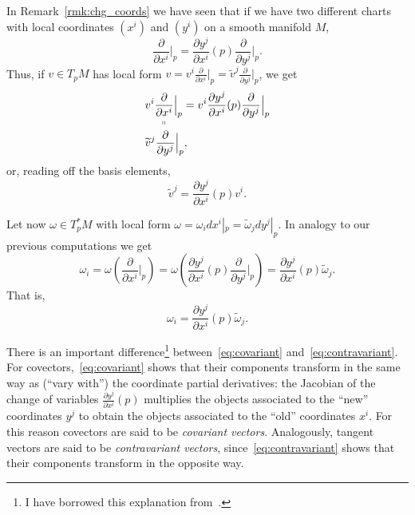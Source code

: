 In Remark~\ref{rmk:chg_coords} we have seen that if we have two different charts with local coordinates $(x^i)$ and $(y^i)$ on a smooth manifold $M$,
\begin{equation}
  \frac{\partial}{\partial x^i}\Big|_p = \frac{\partial y^j}{\partial x^i}(p) \frac{\partial}{\partial y^j}\Big|_p.
\end{equation}
Thus, if $v\in T_pM$ has local form $v = v^i \frac{\partial}{\partial x^i}\big|_p = \widetilde v^j \frac{\partial}{\partial y^j}\big|_p$, we get 
\begin{align}
  & \underset{\shortparallel}{v^i \frac{\partial}{\partial x^i}\Big|_p} = v^i \frac{\partial y^j}{\partial x^i}(p) \frac{\partial}{\partial y^j}\Big|_p \\
  & \widetilde v^j \frac{\partial}{\partial y^j}\Big|_p,
\end{align}
or, reading off the basis elements,
\begin{equation}\label{eq:contravariant}
  \widetilde v^j = \frac{\partial y^j}{\partial x^i}(p) v^i.
\end{equation}

Let now $\omega\in T_p^*M$ with local form $\omega = \omega_i dx^i|_p = \widetilde \omega_j dy^j|_p$.
In analogy to our previous computations we get
\begin{equation}
  \omega_i
  = \omega\left(\frac{\partial}{\partial x^i}\Big|_p\right)
  = \omega\left(\frac{\partial y^j}{\partial x^i}(p) \frac{\partial}{\partial y^j}\Big|_p\right)
  = \frac{\partial y^j}{\partial x^i}(p) \widetilde\omega_j.
\end{equation}
That is,
\begin{equation}\label{eq:covariant}
  \omega_i = \frac{\partial y^j}{\partial x^i}(p) \widetilde\omega_j.
\end{equation}

There is an important difference\footnote{I have borrowed this explanation from~\cite[Chapter 11]{book:lee}.} between~\eqref{eq:covariant} and~\eqref{eq:contravariant}.
For covectors,~\eqref{eq:covariant} shows that their components transform in the same way as (``vary with'') the coordinate partial derivatives: the Jacobian of the change of variables $\frac{\partial y^j}{\partial x^i}(p)$ multiplies the objects associated to the ``new'' coordinates $y^j$ to obtain the objects associated to the ``old'' coordinates $x^i$.
For this reason covectors are said to be \emph{covariant vectors}.
Analogously, tangent vectors are said to be \emph{contravariant vectors}, since~\eqref{eq:contravariant} shows that their components transform in the opposite way.

